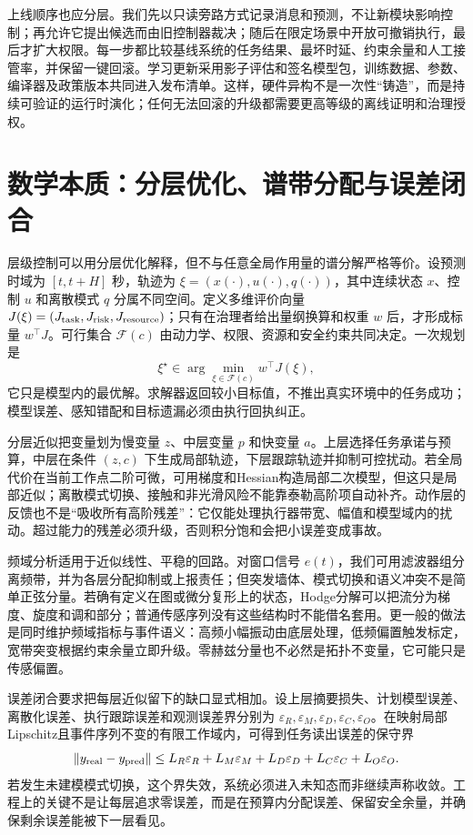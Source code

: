上线顺序也应分层。我们先以只读旁路方式记录消息和预测，不让新模块影响控制；再允许它提出候选而由旧控制器裁决；随后在限定场景中开放可撤销执行，最后才扩大权限。每一步都比较基线系统的任务结果、最坏时延、约束余量和人工接管率，并保留一键回滚。学习更新采用影子评估和签名模型包，训练数据、参数、编译器及政策版本共同进入发布清单。这样，硬件异构不是一次性“铸造”，而是持续可验证的运行时演化；任何无法回滚的升级都需要更高等级的离线证明和治理授权。

\section{数学本质：分层优化、谱带分配与误差闭合}
\label{sec:functional_fitting_and_spectral_decomposition}

层级控制可以用分层优化解释，但不与任意全局作用量的谱分解严格等价。设预测时域为 $[t,t+H]$ 秒，轨迹为 $\xi=(x(\cdot),u(\cdot),q(\cdot))$，其中连续状态 $x$、控制 $u$ 和离散模式 $q$ 分属不同空间。定义多维评价向量 $J(\xi)=(J_{\rm task},J_{\rm risk},J_{\rm resource})$；只有在治理者给出量纲换算和权重 $w$ 后，才形成标量 $w^\top J$。可行集合 $\mathcal F(c)$ 由动力学、权限、资源和安全约束共同决定。一次规划是
\begin{equation}
 \xi^\star\in\arg\min_{\xi\in\mathcal F(c)} w^\top J(\xi),
\end{equation}
它只是模型内的最优解。求解器返回较小目标值，不推出真实环境中的任务成功；模型误差、感知错配和目标遗漏必须由执行回执纠正。

分层近似把变量划为慢变量 $z$、中层变量 $p$ 和快变量 $a$。上层选择任务承诺与预算，中层在条件 $(z,c)$ 下生成局部轨迹，下层跟踪轨迹并抑制可控扰动。若全局代价在当前工作点二阶可微，可用梯度和Hessian构造局部二次模型，但这只是局部近似；离散模式切换、接触和非光滑风险不能靠泰勒高阶项自动补齐。动作层的反馈也不是“吸收所有高阶残差”：它仅能处理执行器带宽、幅值和模型域内的扰动。超过能力的残差必须升级，否则积分饱和会把小误差变成事故。

频域分析适用于近似线性、平稳的回路。对窗口信号 $e(t)$，我们可用滤波器组分离频带，并为各层分配抑制或上报责任；但突发墙体、模式切换和语义冲突不是简单正弦分量。若确有定义在图或微分复形上的状态，Hodge分解可以把流分为梯度、旋度和调和部分；普通传感序列没有这些结构时不能借名套用。更一般的做法是同时维护频域指标与事件语义：高频小幅振动由底层处理，低频偏置触发标定，宽带突变根据约束余量立即升级。零赫兹分量也不必然是拓扑不变量，它可能只是传感偏置。

误差闭合要求把每层近似留下的缺口显式相加。设上层摘要损失、计划模型误差、离散化误差、执行跟踪误差和观测误差界分别为 $\varepsilon_R,\varepsilon_M,\varepsilon_D,\varepsilon_C,\varepsilon_O$。在映射局部Lipschitz且事件序列不变的有限工作域内，可得到任务读出误差的保守界
\begin{equation}
 \|y_{\rm real}-y_{\rm pred}\|
 \leq L_R\varepsilon_R+L_M\varepsilon_M+L_D\varepsilon_D
 +L_C\varepsilon_C+L_O\varepsilon_O.
\end{equation}
若发生未建模模式切换，这个界失效，系统必须进入未知态而非继续声称收敛。工程上的关键不是让每层追求零误差，而是在预算内分配误差、保留安全余量，并确保剩余误差能被下一层看见。

